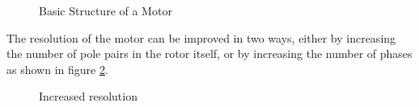 \begin{figure}[htp]
    \centering
    \hfill%
    \caption{Basic Structure of a Motor}
    \label{fig:bas_struct} 
\end{figure}

The resolution of the motor can be improved in two ways, either by increasing the number of pole pairs in the rotor itself, or by increasing the number of phases as shown in figure \ref{fig:inc_res}.


\begin{figure}[htp]
    \centering
    \hfill%
	\hfill%
	\caption{Increased resolution}
	\label{fig:inc_res}
\end{figure}

